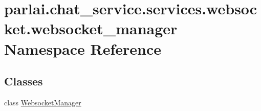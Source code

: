 \hypertarget{namespaceparlai_1_1chat__service_1_1services_1_1websocket_1_1websocket__manager}{}\section{parlai.\+chat\+\_\+service.\+services.\+websocket.\+websocket\+\_\+manager Namespace Reference}
\label{namespaceparlai_1_1chat__service_1_1services_1_1websocket_1_1websocket__manager}
\subsection*{Classes}
\begin{DoxyCompactItemize}
\item 
class \hyperlink{classparlai_1_1chat__service_1_1services_1_1websocket_1_1websocket__manager_1_1WebsocketManager}{Websocket\+Manager}
\end{DoxyCompactItemize}
